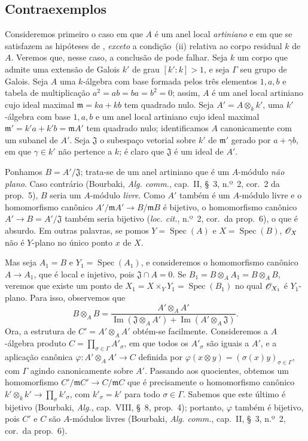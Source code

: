 \subsection{Contraexemplos}
\label{subsection:IV.11.7}

\begin{env}[11.7.1]
\label{IV.11.7.1}
Consideremos primeiro o caso
em que $A$ é um anel local
\emph{artiniano} e em que se
satisfazem as hipóteses de
, \emph{exceto}
a condição~(ii) relativa ao
corpo residual $k$ de $A$.
Veremos que, nesse caso,
a conclusão de 
pode falhar. Seja $k$ um corpo
que admite uma extensão de
Galois $k'$ de grau $[k':k]>1$,
e seja $\Gamma$ seu grupo de
Galois. Seja $A$ uma
$k$-álgebra com base formada
pelos três elementos $1,a,b$
e tabela de multiplicação
$a^2=ab=ba=b^2=0$; assim,
$A$ é um anel local artiniano
cujo ideal maximal
$\mathfrak m=ka+kb$ tem
quadrado nulo. Seja
$A'=A\otimes_k k'$, uma
$k'$-álgebra com base
$1,a,b$ e um anel local
artiniano cujo ideal maximal
$\mathfrak m'=k'a+k'b
=\mathfrak m A'$ tem quadrado
nulo; identificamos $A$
canonicamente com um subanel
de $A'$. Seja $\mathfrak J$
o subespaço vetorial sobre
$k'$ de $\mathfrak m'$ gerado
por $a+\gamma b$, em que
$\gamma\in k'$ não pertence
a $k$; é claro que
$\mathfrak J$ é um ideal de
$A'$.

Ponhamos $B=A'/\mathfrak J$;
trata-se de um anel artiniano
que é um $A$-módulo
\emph{não plano}. Caso
contrário (Bourbaki,
\emph{Alg. comm.}, cap.~II,
\S~3, n.º~2, cor.~2 da prop.~5),
$B$ seria um $A$-módulo
\emph{livre}. Como $A'$ também
é um $A$-módulo livre e o
homomorfismo canônico
$A'/\mathfrak m A'
\to B/\mathfrak m B$ é
bijetivo, o homomorfismo
canônico $A'\to B=A'/\mathfrak J$
também seria
bijetivo (\emph{loc. cit.},
n.º~2, cor.~da prop.~6),
o que é absurdo. Em outras
palavras, se pomos
$Y=\operatorname{Spec}(A)$
e $X=\operatorname{Spec}(B)$,
$\mathscr{O}_X$ não é $Y$-plano
no único ponto $x$ de $X$.

Mas seja $A_1=B$ e
$Y_1=\operatorname{Spec}(A_1)$,
e consideremos o homomorfismo
canônico $A\to A_1$, que é
local e injetivo, pois
$\mathfrak J\cap A=0$. Se
$B_1=B\otimes_A A_1
=B\otimes_A B$, veremos
que existe um ponto de
$X_1=X\times_Y Y_1
=\operatorname{Spec}(B_1)$
no qual $\mathscr{O}_{X_1}$ é
$Y_1$-plano. Para isso,
observemos que
\[
B\otimes_A B
=\frac{A'\otimes_A A'}
{\operatorname{Im}(\mathfrak J
\otimes_A A')
+\operatorname{Im}(A'\otimes_A
\mathfrak J)}.
\]
Ora, a estrutura de
$C'=A'\otimes_A A'$ obtém-se
facilmente. Consideremos a
$A$-álgebra produto
$C=\prod_{\sigma\in\Gamma}
A'_{\sigma}$, em que todos os
$A'_{\sigma}$ são iguais a
$A'$, e a aplicação canônica
$\varphi:A'\otimes_A A'\to C$
definida por
$\varphi(x\otimes y)
=(\sigma(x)y)_{\sigma\in\Gamma}$,
com $\Gamma$ agindo
canonicamente sobre $A'$.
Passando aos quocientes,
obtemos um homomorfismo
$C'/\mathfrak m C'
\to C/\mathfrak m C$ que é
precisamente o homomorfismo
canônico $k'\otimes_k k'
\to\prod_{\sigma}k'_{\sigma}$,
com $k'_{\sigma}=k'$ para
todo $\sigma\in\Gamma$.
Sabemos que este último é
bijetivo (Bourbaki,
\emph{Alg.}, cap.~VIII,
\S~8, prop.~4); portanto,
$\varphi$ também é bijetivo,
pois $C'$ e $C$ são
$A$-módulos livres (Bourbaki,
\emph{Alg. comm.}, cap.~II,
\S~3, n.º~2, cor.~da prop.~6).


\end{env}
